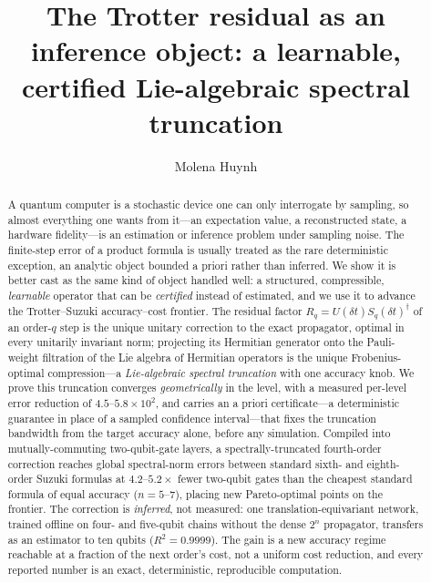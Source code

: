 \documentclass[aps,prxquantum,reprint,superscriptaddress,nofootinbib,amsmath,amssymb]{revtex4-2}
\newcommand{\dt}{\delta t}
\begin{document}
\title{The Trotter residual as an inference object: a learnable, certified Lie-algebraic spectral truncation}
\author{Molena Huynh}

\begin{abstract}
A quantum computer is a stochastic device one can only interrogate by sampling, so almost everything one wants from it---an expectation value, a reconstructed state, a hardware fidelity---is an estimation or inference problem under sampling noise. The finite-step error of a product formula is usually treated as the rare deterministic exception, an analytic object bounded a priori rather than inferred. We show it is better cast as the same kind of object handled well: a structured, compressible, \emph{learnable} operator that can be \emph{certified} instead of estimated, and we use it to advance the Trotter--Suzuki accuracy--cost frontier. The residual factor $R_q=U(\dt)S_q(\dt)^\dagger$ of an order-$q$ step is the unique unitary correction to the exact propagator, optimal in every unitarily invariant norm; projecting its Hermitian generator onto the Pauli-weight filtration of the Lie algebra of Hermitian operators is the unique Frobenius-optimal compression---a \emph{Lie-algebraic spectral truncation} with one accuracy knob. We prove this truncation converges \emph{geometrically} in the level, with a measured per-level error reduction of $4.5$--$5.8\times10^{2}$, and carries an a priori certificate---a deterministic guarantee in place of a sampled confidence interval---that fixes the truncation bandwidth from the target accuracy alone, before any simulation. Compiled into mutually-commuting two-qubit-gate layers, a spectrally-truncated fourth-order correction reaches global spectral-norm errors between standard sixth- and eighth-order Suzuki formulas at $4.2$--$5.2\times$ fewer two-qubit gates than the cheapest standard formula of equal accuracy ($n=5$--$7$), placing new Pareto-optimal points on the frontier. The correction is \emph{inferred}, not measured: one translation-equivariant network, trained offline on four- and five-qubit chains without the dense $2^n$ propagator, transfers as an estimator to ten qubits ($R^2=0.9999$). The gain is a new accuracy regime reachable at a fraction of the next order's cost, not a uniform cost reduction, and every reported number is an exact, deterministic, reproducible computation.
\end{abstract}

\maketitle
\end{document}
